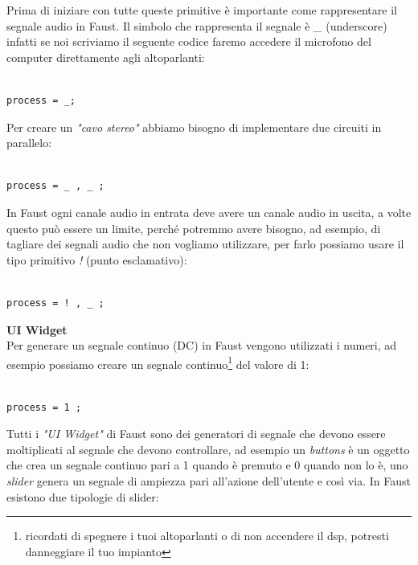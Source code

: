 \documentclass[11pt]{article}
\begin{document}
\begin{multicols*}{2}
Prima di iniziare con tutte queste primitive è importante come rappresentare il segnale audio in Faust. Il simbolo che rappresenta il segnale è \textit{\_} (underscore) infatti se noi scriviamo il seguente codice faremo accedere il microfono del computer direttamente agli altoparlanti:

\begin{Verbatim}[fontsize=\scriptsize]

process = _;

\end{Verbatim}

Per creare un \textit{"cavo stereo"} abbiamo bisogno di implementare due circuiti in parallelo:

\begin{Verbatim}[fontsize=\scriptsize]

process = _ , _ ;

\end{Verbatim}

In Faust ogni canale audio in entrata deve avere un canale audio in uscita, a volte questo può essere un limite, perché potremmo avere bisogno, ad esempio, di tagliare dei segnali audio che non vogliamo utilizzare, per farlo possiamo usare il tipo primitivo \textit{!} (punto esclamativo): 

\begin{Verbatim}[fontsize=\scriptsize]

process = ! , _ ;

\end{Verbatim}

\textbf{UI Widget}\\

Per generare un segnale continuo (DC) in Faust vengono utilizzati i numeri, ad esempio possiamo creare un segnale continuo\footnote{ricordati di spegnere i tuoi altoparlanti o di non accendere il dsp, potresti danneggiare il tuo impianto} del valore di 1:

\begin{Verbatim}[fontsize=\scriptsize]

process = 1 ;

\end{Verbatim}

Tutti i \textit{"UI Widget"} di Faust sono dei generatori di segnale che devono essere moltiplicati al segnale che devono controllare, ad esempio un \textit{buttons} è un oggetto che crea un segnale continuo pari a 1 quando è premuto e 0 quando non lo è, uno \textit{slider} genera un segnale di ampiezza pari all'azione dell'utente e così via. In Faust esistono due tipologie di slider:


\end{multicols*}
\end{document}

